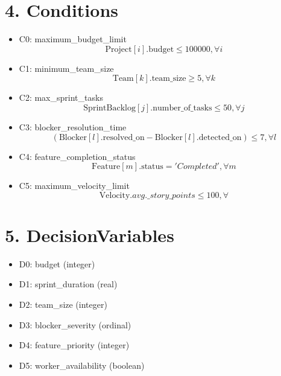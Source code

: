 \documentclass{article}
\begin{document}
\section{4. Conditions}
\begin{itemize}
    \item C0: maximum\_budget\_limit
        \[
        \text{Project}[i].\text{budget} \leq 100000, \forall i
        \]
    \item C1: minimum\_team\_size
        \[
        \text{Team}[k].\text{team\_size} \geq 5, \forall k
        \]
    \item C2: max\_sprint\_tasks
        \[
        \text{SprintBacklog}[j].\text{number\_of\_tasks} \leq 50, \forall j
        \]
    \item C3: blocker\_resolution\_time
        \[
        (\text{Blocker}[l].\text{resolved\_on} - \text{Blocker}[l].\text{detected\_on}) \leq 7, \forall l
        \]
    \item C4: feature\_completion\_status
        \[
        \text{Feature}[m].\text{status} = 'Completed', \forall m
        \]
    \item C5: maximum\_velocity\_limit
        \[
        \text{Velocity}.avg.\_story\_points \leq 100, \forall
        \]
\end{itemize}

\section{5. DecisionVariables}
\begin{itemize}
    \item D0: budget (integer)
    \item D1: sprint\_duration (real)
    \item D2: team\_size (integer)
    \item D3: blocker\_severity (ordinal)
    \item D4: feature\_priority (integer)
    \item D5: worker\_availability (boolean)
\end{itemize}
\end{document}
